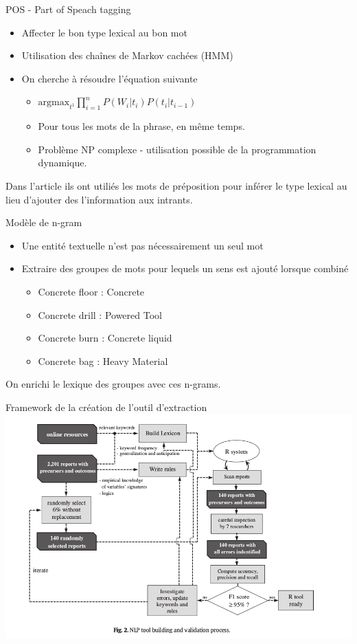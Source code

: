\begin{frame}	
	POS - Part of Speach tagging
	\begin{itemize}
		\item Affecter le bon type lexical au bon mot
		\item Utilisation des chaînes de Markov cachées (HMM)
		\item On cherche à résoudre l'équation suivante
		\begin{itemize}
			\item $\textrm{argmax}_{t^1}  \prod_{i=1}^{n}  P(W_i|t_i) P(t_i|t_{i-1}) $
			\item Pour tous les mots de la phrase, en même temps.
			\item Problème NP complexe - utilisation possible de la programmation dynamique.
		\end{itemize}
	\end{itemize}
	Dans l'article ils ont utiliés les mots de préposition pour inférer le type lexical au lieu d'ajouter des l'information aux intrants.
\end{frame}

\begin{frame}	
	Modèle de n-gram
	\begin{itemize}
		\item Une entité textuelle n'est pas nécessairement un seul mot
		\item Extraire des groupes de mots pour lequels un sens est ajouté lorsque combiné
		\begin{itemize}
			\item Concrete floor : Concrete
			\item Concrete drill : Powered Tool
			\item Concrete burn : Concrete liquid 
			\item Concrete bag : Heavy Material
		\end{itemize}	
	\end{itemize}
	On enrichi le lexique des groupes avec ces n-grams.
\end{frame}

\begin{frame}	
	Framework de la création de l'outil d'extraction
	\includegraphics[width=\paperwidth]{rtool_training_framework}
\end{frame}



